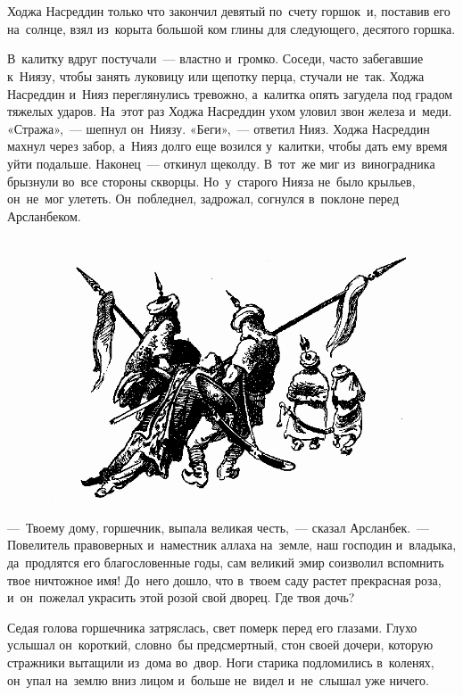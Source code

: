\documentclass[12pt,a4paper]{book}
\begin{document}
\chapter{}

Ходжа Насреддин только что закончил девятый по~счету горшок~и, поставив его на~солнце, взял из~корыта большой ком глины для следующего, десятого горшка.

В~калитку вдруг постучали~— властно и~громко. Соседи, часто забегавшие к~Ниязу, чтобы занять луковицу или щепотку перца, стучали не~так. Ходжа Насреддин и~Нияз переглянулись тревожно, а~калитка опять загудела под градом тяжелых ударов. На~этот раз Ходжа Насреддин ухом уловил звон железа и~меди. «Стража»,~— шепнул он~Ниязу. «Беги»,~— ответил Нияз. Ходжа Насреддин махнул через забор, а~Нияз долго еще возился у~калитки, чтобы дать ему время уйти подальше. Наконец~— откинул щеколду. В~тот~же миг из~виноградника брызнули во~все стороны скворцы. Но~у~старого Нияза не~было крыльев, он~не~мог улететь. Он~побледнел, задрожал, согнулся в~поклоне перед Арсланбеком.

\begin{figure}[h]
\centering
\includegraphics[width=\textwidth]{11.png}
\end{figure}

—~Твоему дому, горшечник, выпала великая честь,~— сказал Арсланбек.~— Повелитель правоверных и~наместник аллаха на~земле, наш господин и~владыка, да~продлятся его благословенные годы, сам великий эмир соизволил вспомнить твое ничтожное имя! До~него дошло, что в~твоем саду растет прекрасная роза, и~он~пожелал украсить этой розой свой дворец. Где твоя дочь?

Седая голова горшечника затряслась, свет померк перед его глазами. Глухо услышал он~короткий, словно~бы предсмертный, стон своей дочери, которую стражники вытащили из~дома во~двор. Ноги старика подломились в~коленях, он~упал на~землю вниз лицом и~больше не~видел и~не~слышал уже ничего.
\end{document}
